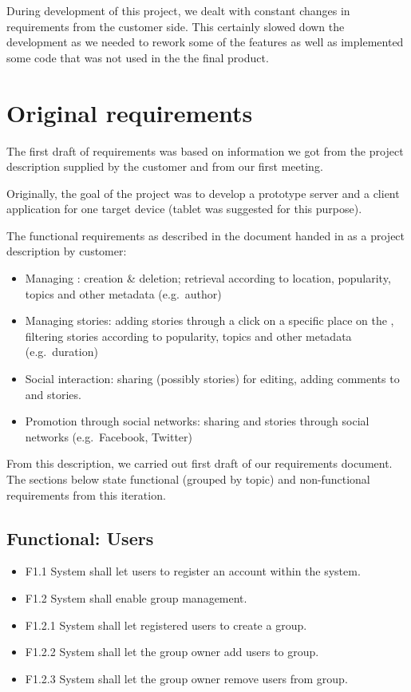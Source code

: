 \documentclass[11pt]{book}
\begin{document}
During development of this project, we dealt with constant changes in requirements from the customer side. This certainly slowed down the development as we needed to rework some of the features as well as implemented some code that was not used in the the final product.

\section{Original requirements}\label{original-requirements}

The first draft of requirements was based on information we got from the project description supplied by the customer and from our first meeting.

Originally, the goal of the project was to develop a prototype server and a client application for one target device (tablet was suggested for this purpose).

The functional requirements as described in the document handed in as a project description by customer:

\begin{itemize}
  \item Managing \wallentityp: creation \& deletion; retrieval according to location, popularity, topics and other metadata (e.g.~author)
  \item Managing stories: adding stories through a click on a specific place on the \wallentitys, filtering stories according to popularity, topics and other metadata (e.g.~duration)
  \item Social interaction: sharing \wallentityp (possibly stories) for editing, adding comments to \wallentityp and stories.
  \item Promotion through social networks: sharing \wallentityp and stories through social networks (e.g.~Facebook, Twitter)
\end{itemize}

From this description, we carried out first draft of our requirements document. The sections below state functional (grouped by topic) and non-functional requirements from this iteration.

\subsection{Functional: Users}\label{functional-users}

\begin{itemize}
  \item F1.1 System shall let users to register an account within the system.
  \item F1.2 System shall enable group management.
  \item F1.2.1 System shall let registered users to create a group.
  \item F1.2.2 System shall let the group owner add users to group.
  \item F1.2.3 System shall let the group owner remove users from group.
\end{itemize}
\end{document}
